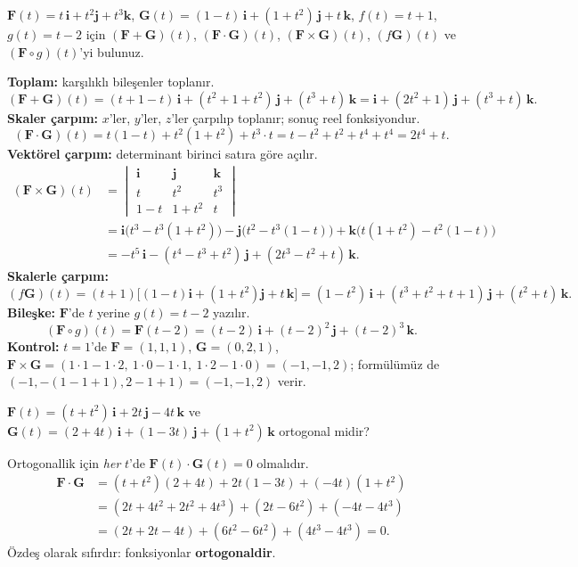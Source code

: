 \begin{soru}
$\mathbf F(t)=t\,\mathbf i+t^2\mathbf j+t^3\mathbf k$, $\mathbf G(t)=(1-t)\,\mathbf i+(1+t^2)\,\mathbf j+t\,\mathbf k$, $f(t)=t+1$, $g(t)=t-2$ için
$(\mathbf F+\mathbf G)(t)$, $(\mathbf F\cdot\mathbf G)(t)$, $(\mathbf F\times\mathbf G)(t)$, $(f\mathbf G)(t)$ ve $(\mathbf F\circ g)(t)$'yi bulunuz.
\end{soru}
\begin{cevap}
\textbf{Toplam:} karşılıklı bileşenler toplanır.
\[ (\mathbf F+\mathbf G)(t)=(t+1-t)\,\mathbf i+(t^2+1+t^2)\,\mathbf j+(t^3+t)\,\mathbf k=\mathbf i+(2t^2+1)\,\mathbf j+(t^3+t)\,\mathbf k . \]
\textbf{Skaler çarpım:} $x$'ler, $y$'ler, $z$'ler çarpılıp toplanır; sonuç reel fonksiyondur.
\[ (\mathbf F\cdot\mathbf G)(t)=t(1-t)+t^2(1+t^2)+t^3\cdot t=t-t^2+t^2+t^4+t^4=2t^4+t . \]
\textbf{Vektörel çarpım:} determinant birinci satıra göre açılır.
\begin{align*}
(\mathbf F\times\mathbf G)(t)&=\begin{vmatrix}\mathbf i&\mathbf j&\mathbf k\\t&t^2&t^3\\1-t&1+t^2&t\end{vmatrix}\\
&=\mathbf i\big(t^3-t^3(1+t^2)\big)-\mathbf j\big(t^2-t^3(1-t)\big)+\mathbf k\big(t(1+t^2)-t^2(1-t)\big)\\
&=-t^5\,\mathbf i-(t^4-t^3+t^2)\,\mathbf j+(2t^3-t^2+t)\,\mathbf k .
\end{align*}
\textbf{Skalerle çarpım:}
\[ (f\mathbf G)(t)=(t+1)\big[(1-t)\mathbf i+(1+t^2)\mathbf j+t\,\mathbf k\big]=(1-t^2)\,\mathbf i+(t^3+t^2+t+1)\,\mathbf j+(t^2+t)\,\mathbf k . \]
\textbf{Bileşke:} $\mathbf F$'de $t$ yerine $g(t)=t-2$ yazılır.
\[ (\mathbf F\circ g)(t)=\mathbf F(t-2)=(t-2)\,\mathbf i+(t-2)^2\,\mathbf j+(t-2)^3\,\mathbf k . \]
\textbf{Kontrol:} $t=1$'de $\mathbf F=(1,1,1)$, $\mathbf G=(0,2,1)$, $\mathbf F\times\mathbf G=(1\cdot1-1\cdot2,\ 1\cdot0-1\cdot1,\ 1\cdot2-1\cdot0)=(-1,-1,2)$;
formülümüz de $(-1,-(1-1+1),2-1+1)=(-1,-1,2)$ verir. \checkmark
\end{cevap}

\begin{soru}
$\mathbf F(t)=(t+t^2)\,\mathbf i+2t\,\mathbf j-4t\,\mathbf k$ ve $\mathbf G(t)=(2+4t)\,\mathbf i+(1-3t)\,\mathbf j+(1+t^2)\,\mathbf k$ ortogonal midir?
\end{soru}
\begin{cevap}
Ortogonallik için \emph{her} $t$'de $\mathbf F(t)\cdot\mathbf G(t)=0$ olmalıdır.
\begin{align*}
\mathbf F\cdot\mathbf G&=(t+t^2)(2+4t)+2t(1-3t)+(-4t)(1+t^2)\\
&=(2t+4t^2+2t^2+4t^3)+(2t-6t^2)+(-4t-4t^3)\\
&=(2t+2t-4t)+(6t^2-6t^2)+(4t^3-4t^3)=0 .
\end{align*}
Özdeş olarak sıfırdır: fonksiyonlar \textbf{ortogonaldir}.
\end{cevap}

